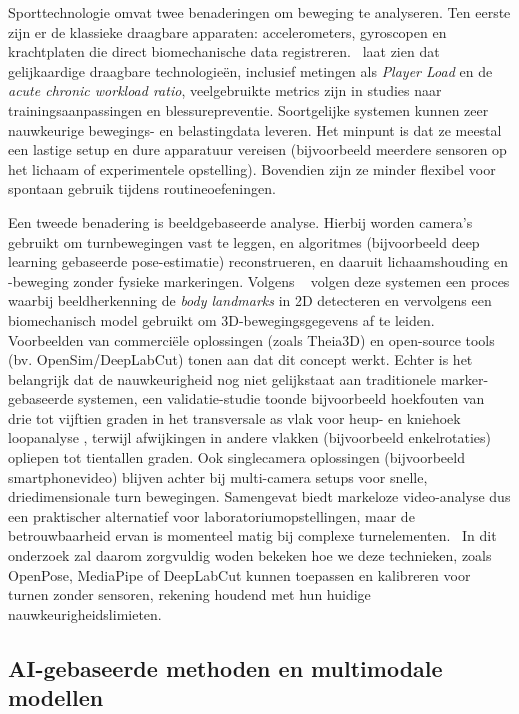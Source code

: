 Sporttechnologie omvat twee benaderingen om beweging te analyseren. Ten eerste zijn er de klassieke draagbare apparaten: accelerometers, gyroscopen en krachtplaten die direct biomechanische data registreren.~\textcite{Rebelo2023} laat zien dat gelijkaardige draagbare technologieën, inclusief metingen als \textit{Player Load} en de \textit{acute chronic workload ratio}, veelgebruikte metrics zijn in studies naar trainingsaanpassingen en blessurepreventie. Soortgelijke systemen kunnen zeer nauwkeurige bewegings- en belastingdata leveren. Het minpunt is dat ze meestal een lastige setup en dure apparatuur vereisen (bijvoorbeeld meerdere sensoren op het lichaam of experimentele opstelling). Bovendien zijn ze minder flexibel voor spontaan gebruik tijdens routineoefeningen.

Een tweede benadering is beeldgebaseerde analyse. Hierbij worden camera's gebruikt om turnbewegingen vast te leggen, en algoritmes (bijvoorbeeld deep learning gebaseerde pose-esti\-matie) reconstrueren, en daaruit lichaamshouding en -beweging zonder fysieke markeringen. Volgens ~\textcite{Adlou2025} volgen deze systemen een proces waarbij beeldherkenning de \textit{body landmarks} in 2D detecteren en vervolgens een biomechanisch model gebruikt om 3D-bewegings\-gegevens af te leiden. Voorbeelden van commerciële oplossingen (zoals Theia3D) en open-source tools (bv. OpenSim/DeepLabCut) tonen aan dat dit concept werkt. Echter is het belangrijk dat de nauwkeurigheid nog niet gelijkstaat aan traditionele marker-gebaseerde systemen, een validatie-studie toonde bijvoorbeeld hoekfouten van drie tot vijftien graden in het transversale as vlak voor heup- en kniehoek loopanalyse , terwijl afwijkingen in andere vlakken (bijvoorbeeld enkelrotaties) opliepen tot tientallen graden. Ook singlecamera oplossingen (bijvoorbeeld smartphonevideo) blijven achter bij multi-camera setups voor snelle, driedimensionale turn bewegingen. Samengevat biedt markeloze video-analyse dus een praktischer alternatief voor laboratoriumopstellingen, maar de betrouwbaarheid ervan is momenteel matig bij complexe turnelementen.~\autocite{Adlou2025} In dit onderzoek zal daarom zorgvuldig woden bekeken hoe we deze technieken, zoals OpenPose, MediaPipe of DeepLabCut kunnen toepassen en kalibreren voor turnen zonder sensoren, rekening houdend met hun huidige nauwkeurigheidslimieten.

\subsection{AI-gebaseerde methoden en multimodale modellen}

